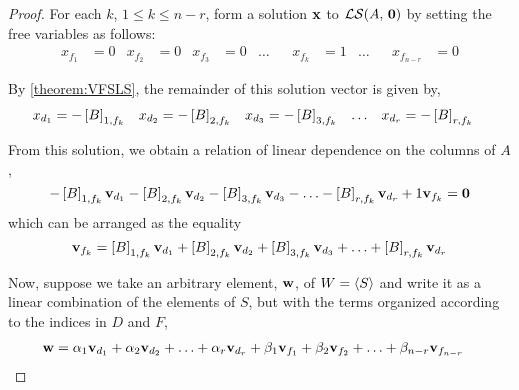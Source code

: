 \documentclass{ximera}
\begin{document}
\begin{theorem}
\begin{proof}
    For each $k$, $1\leq k\leq n-r$, form a solution $\mathbf{x}$ to
    $\mathcal{LS}\!\left(A,\,\mathbf{0}\right)$ by setting the free variables as follows:
    \begin{align*}
      x_{f_1}&=0
      &
        x_{f_2}&=0
      &
        x_{f_3}&=0
      &
        \ldots&
      &
        x_{f_k}&=1
      &
        \ldots&
      &
        x_{f_{n-r}}&=0
    \end{align*}
    
    By \ref{theorem:VFSLS}, the remainder of this solution vector is given by,
    \begin{align*}
      x_{d_1}&=-\left\lbrack B\right\rbrack_{1,f_k}
      &
        x_{d_2}&=-\left\lbrack B\right\rbrack_{2,f_k}
      &
        x_{d_3}&=-\left\lbrack B\right\rbrack_{3,f_k}
      &
        \dots&
      &
        x_{d_r}&=-\left\lbrack B\right\rbrack_{r,f_k}
    \end{align*}
    
    From this solution, we obtain a relation of linear dependence on
    the columns of $A$,
    \[
      -\left\lbrack B\right\rbrack_{1,f_k}\mathbf{v}_{d_1}
      -\left\lbrack B\right\rbrack_{2,f_k}\mathbf{v}_{d_2}
      -\left\lbrack B\right\rbrack_{3,f_k}\mathbf{v}_{d_3}
      -\ldots
      -\left\lbrack B\right\rbrack_{r,f_k}\mathbf{v}_{d_r}
      +1\mathbf{v}_{f_k}
      =\mathbf{0}
    \]
    which can be arranged as the equality
    \[
      \mathbf{v}_{f_k}=
      \left\lbrack B\right\rbrack_{1,f_k}\mathbf{v}_{d_1}+
      \left\lbrack B\right\rbrack_{2,f_k}\mathbf{v}_{d_2}+
      \left\lbrack B\right\rbrack_{3,f_k}\mathbf{v}_{d_3}+
      \ldots+
      \left\lbrack B\right\rbrack_{r,f_k}\mathbf{v}_{d_r}
    \]
    
    Now, suppose we take an arbitrary element, $\mathbf{w}$, of
    $W=\left\langle S\right\rangle$ and write it as a linear combination of the elements
    of $S$, but with the terms organized according to the indices in
    $D$ and $F$,
    \begin{align*}
      \mathbf{w}&=
                \alpha_1\mathbf{v}_{d_1}+
                \alpha_2\mathbf{v}_{d_2}+
                \ldots+
                \alpha_r\mathbf{v}_{d_r}+
                \beta_1\mathbf{v}_{f_1}+
                \beta_2\mathbf{v}_{f_2}+
                \ldots+
                \beta_{n-r}\mathbf{v}_{f_{n-r}}
    \end{align*}
    

\end{proof}
\end{theorem}
\end{document}
